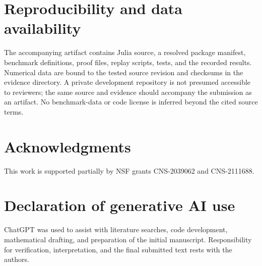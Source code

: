 \documentclass[5p,times]{elsarticle}
\theoremstyle{definition}\newtheorem{definition}[theorem]{Definition}
\theoremstyle{remark}\newtheorem{remark}[theorem]{Remark}
\begin{document}
\section*{Reproducibility and data availability}
The accompanying artifact contains Julia source, a resolved package manifest, benchmark definitions, proof files, replay scripts, tests, and the recorded results. Numerical data are bound to the tested source revision and checksums in the evidence directory. A private development repository is not presumed accessible to reviewers; the same source and evidence should accompany the submission as an artifact. No benchmark-data or code license is inferred beyond the cited source terms.

\section*{Acknowledgments}
This work is supported partially by NSF grants CNS-2039062 and CNS-2111688.

\section*{Declaration of generative AI use}
ChatGPT was used to assist with literature searches, code development, mathematical drafting, and preparation of the initial manuscript. Responsibility for verification, interpretation, and the final submitted text rests with the authors.



\end{document}
